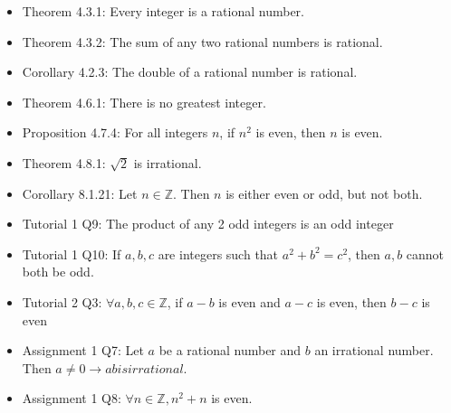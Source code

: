 \documentclass{article}
\begin{document}
\begin{itemize}
    \item Theorem 4.3.1: Every integer is a rational number.
    \item Theorem 4.3.2: The sum of any two rational numbers is rational.
    \item Corollary 4.2.3: The double of a rational number is rational.
    \item Theorem 4.6.1: There is no greatest integer.
    \item Proposition 4.7.4: For all integers $n$, if $n^2$ is even, then $n$ is even.
    \item Theorem 4.8.1: $\sqrt{2}$ is irrational.
    \item Corollary 8.1.21: Let $n\in \mathbb{Z}$. Then $n$ is either even or odd, but not both.
    \item Tutorial 1 Q9: The product of any 2 odd integers is an odd integer
    \item Tutorial 1 Q10: If $a,b,c$ are integers such that $a^{2} + b^{2} = c^{2}$, then $a,b$ cannot both be odd.
    \item Tutorial 2 Q3: $\forall a,b,c \in \mathbb{Z}$, if $a - b$ is even and $a - c$ is even, then $b - c$ is even
    \item Assignment 1 Q7: Let $a$ be a rational number and $b$ an irrational number. Then $a \neq 0 \xrightarrow{} ab is irrational$.
    \item Assignment 1 Q8: $\forall n \in \mathbb{Z}, n^2 + n$ is even.
\end{itemize}

\end{document}
